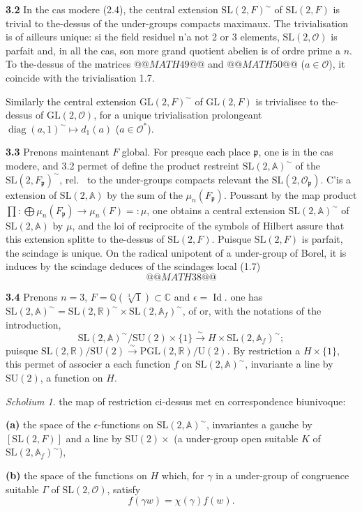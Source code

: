 \documentclass[12pt,a4paper]{article}
\theoremstyle{plain}
\theoremstyle{definition}
\theoremstyle{remark}
\newtheorem{scholie}[theorem]{Scholium}
\DeclareMathOperator{\diag}{diag}
\DeclareMathOperator{\id}{Id}
\newcommand{\CC}{\mathbb{C}}
\newcommand{\RR}{\mathbb{R}}
\newcommand{\QQ}{\mathbb{Q}}
\newcommand{\Af}{\mathbb{A}}
\newcommand{\cO}{\mathcal{O}}
\newcommand{\frakp}{\mathfrak{p}}
\providecommand{\CC}{\mathbb{C}}
\providecommand{\QQ}{\mathbb{Q}}
\providecommand{\RR}{\mathbb{R}}
\providecommand{\cO}{\mathcal{O}}
\providecommand{\frakp}{\mathfrak{p}}
\begin{document}
\textbf{3.2} In the cas modere (2.4), the central extension $\mathrm{SL}(2, F)^\sim$ of $\mathrm{SL}(2, F)$ is trivial to the-dessus of the under-groups compacts maximaux. The trivialisation is of ailleurs unique: si the field residuel n'a not 2 or 3 elements, $\mathrm{SL}(2, \cO)$ is parfait and, in all the cas, son more grand quotient abelien is of ordre prime a $n$. To the-dessus of the matrices $@@MATH49@@$ and $@@MATH50@@$ ($a \in \cO$), it coincide with the trivialisation 1.7.

Similarly the central extension $\mathrm{GL}(2, F)^\sim$ of $\mathrm{GL}(2, F)$ is trivialisee to the-dessus of $\mathrm{GL}(2, \cO)$, for a unique trivialisation prolongeant $\diag(a, 1)^\sim \mapsto d_1(a)$ ($a \in \cO^*$).

\textbf{3.3} Prenons maintenant $F$ global. For presque each place $\frakp$, one is in the cas modere, and 3.2 permet of define the product restreint $\mathrm{SL}(2, \Af)^\sim$ of the $\mathrm{SL}(2, F_\frakp)^\sim$, rel.
\ to the under-groups compacts relevant the $\mathrm{SL}(2, \cO_\frakp)$. C'is a extension of $\mathrm{SL}(2, \Af)$ by the sum of the $\mu_n(F_\frakp)$. Poussant by the map product $\prod : \bigoplus \mu_n(F_\frakp) \to \mu_n(F) =: \mu$, one obtains a central extension $\mathrm{SL}(2, \Af)^\sim$ of $\mathrm{SL}(2, \Af)$ by $\mu$, and the loi of reciprocite of the symbols of Hilbert assure that this extension splitte to the-dessus of $\mathrm{SL}(2, F)$. Puisque $\mathrm{SL}(2, F)$ is parfait, the scindage is unique. On the radical unipotent of a under-group of Borel, it is induces by the scindage deduces of the scindages local (1.7)
\[
@@MATH38@@
\tag{3.3.1}
\]

\textbf{3.4} Prenons $n = 3$, $F = \QQ(\sqrt[3]{1}) \subset \CC$ and $\epsilon = \id$. one has $\mathrm{SL}(2, \Af)^\sim = \mathrm{SL}(2, \RR)^\sim \times \mathrm{SL}(2, \Af_f)^\sim$, of or, with the notations of the introduction,
\[
\mathrm{SL}(2, \Af)^\sim / \mathrm{SU}(2) \times \{1\} \xrightarrow{\sim} H \times \mathrm{SL}(2, \Af_f)^\sim;
\]
puisque $\mathrm{SL}(2, \RR) / \mathrm{SU}(2) \xrightarrow{\sim} \mathrm{PGL}(2, \RR) / \mathrm{U}(2)$. By restriction a $H \times \{1\}$, this permet of associer a each function $f$ on $\mathrm{SL}(2, \Af)^\sim$, invariante a line by $\mathrm{SU}(2)$, a function on $H$.

\begin{scholie}
the map of restriction ci-dessus met en correspondence biunivoque:

\textbf{(a)} the space of the $\epsilon$-functions on $\mathrm{SL}(2, \Af)^\sim$, invariantes a gauche by $[\mathrm{SL}(2, F)]$ and a line by $\mathrm{SU}(2) \times$ (a under-group open suitable $K$ of $\mathrm{SL}(2, \Af_f)^\sim$),

\textbf{(b)} the space of the functions on $H$ which, for $\gamma$ in a under-group of congruence suitable $\Gamma$ of $\mathrm{SL}(2, \cO)$, satisfy
\[
f(\gamma w) = \chi(\gamma) f(w).
\]
\end{scholie}
\end{document}
